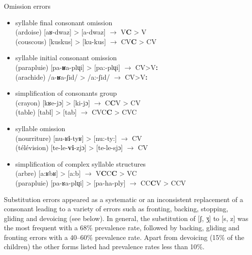 \documentclass[output=paper,newtxmath,modfonts,nonflat,draftmode]{langsci/langscibook}
\begin{document}
\begin{exe}
\ex Omission errors \label{ex:takam:omission_errors}
\begin{itemize}
\item {syllable final consonant omission}\\
(ardoise) [aʁ-dwaz] > [a-dwaz] $\rightarrow$ V\textbf{C} > V\\
(couscous) [kuskus] > [ku-kus] $\rightarrow$ CV\textbf{C} > CV\\

\item {syllable initial consonant omission}\\
(parapluie) [pa-\textbf{ʁ}a-plɥi] > [pa:-plɥi] $\rightarrow$ CV>V\textbf{:}\\
(arachide) /a-\textbf{ʁ}a-ʃid/ >  /a:-ʃid/ $\rightarrow$ CV>V\textbf{:}\\

\item {simplification of consonants group}\\
(crayon) [kʁe-jɔ] > [ki-jɔ] $\rightarrow$ C\textbf{C}V > CV\\
(table)  [tabl] > [tab] $\rightarrow$ CVC\textbf{C} > CVC\\

\item {syllable omission}\\
(nourriture) [nu-ʁ\textbf{i}-tyʁ] > [nu:-ty:] $\rightarrow$ CV\\
(télévision) [te-le-\textbf{vi}-zjɔ] > [te-le-sjɔ] $\rightarrow$ CV\\

\item {simplification of complex syllable structures}\\ 
(arbre)  [a:ʁbʁ] > [a:b] $\rightarrow$ V\textbf{C}C\textbf{C} > VC\\
(parapluie) [pa-ʁa-plɥi] > [pa-ha-ply] $\rightarrow$ CC\textbf{C}V > CCV\\
\end{itemize}
\end{exe}

Substitution errors appeared as a systematic or an inconsistent replacement of a consonant leading to a variety of errors such as fronting, backing, stopping, gliding and devoicing (see  below). In general, the substitution of [ʃ, ʒ] to [s, z] was the most frequent with a 68\% prevalence rate, followed by backing, gliding and fronting errors with a 40--60\% prevalence rate. Apart from devoicing (15\% of the children) the other forms listed had prevalence rates less than 10\%.
\end{document}
